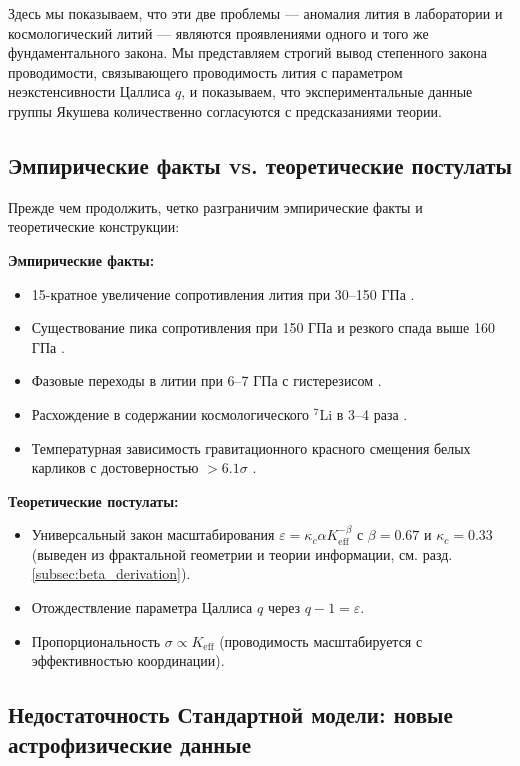 \documentclass[12pt,a4paper]{article}
\theoremstyle{remark}
\newcommand{\Ke}{K_{\mathrm{eff}}}
\newcommand{\kappac}{\kappa_c}
\newcommand{\alp}{\alpha}
\begin{document}
	Здесь мы показываем, что эти две проблемы — аномалия лития в лаборатории и космологический литий — являются проявлениями одного и того же фундаментального закона. Мы представляем строгий вывод степенного закона проводимости, связывающего проводимость лития с параметром неэкстенсивности Цаллиса \(q\), и показываем, что экспериментальные данные группы Якушева \cite{fortov2001, yakushev2002} количественно согласуются с предсказаниями теории.
	
	\subsection{Эмпирические факты vs. теоретические постулаты}
	
	Прежде чем продолжить, четко разграничим эмпирические факты и теоретические конструкции:
	
	\textbf{Эмпирические факты:}
	\begin{itemize}
		\item 15-кратное увеличение сопротивления лития при 30–150 ГПа \cite{fortov2001}.
		\item Существование пика сопротивления при 150 ГПа и резкого спада выше 160 ГПа \cite{yakushev2002}.
		\item Фазовые переходы в литии при 6–7 ГПа с гистерезисом \cite{orlov2001}.
		\item Расхождение в содержании космологического \(^7\)Li в 3–4 раза \cite{bertulani2015}.
		\item Температурная зависимость гравитационного красного смещения белых карликов с достоверностью \(>6.1\sigma\) \cite{Crumpler2024}.
	\end{itemize}
	
	\textbf{Теоретические постулаты:}
	\begin{itemize}
		\item Универсальный закон масштабирования \(\varepsilon = \kappac \alp \Ke^{-\beta}\) с \(\beta = 0.67\) и \(\kappac = 0.33\) (выведен из фрактальной геометрии и теории информации, см. разд. \ref{subsec:beta_derivation}).
		\item Отождествление параметра Цаллиса \(q\) через \(q-1 = \varepsilon\).
		\item Пропорциональность \(\sigma \propto \Ke\) (проводимость масштабируется с эффективностью координации).
	\end{itemize}
	
	\subsection{Недостаточность Стандартной модели: новые астрофизические данные}
	\label{subsec:std-inadequacy}
	
\end{document}
